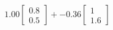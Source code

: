 \documentclass[preview]{standalone}
\begin{document}
\begin{align*}
1.00 \begin{bmatrix} 0.8 \\ 0.5 \end{bmatrix} + -0.36 \begin{bmatrix} 1 \\ 1.6 \end{bmatrix}
\end{align*}
\end{document}
